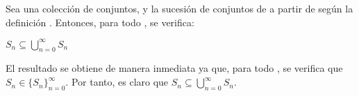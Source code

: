 \begin{isabellebody}
\begin{isamarkuptext}
\begin{lema}
  Sea  una colección de conjuntos,  y  la sucesión de conjuntos de  a partir de
   según la definición . Entonces, para todo , se verifica:

  $S_{n} \subseteq \bigcup_{n = 0}^{\infty} S_{n}$
\end{lema}

\begin{demostracion}
  El resultado se obtiene de manera inmediata ya que, para todo , se verifica que 
  $S_{n} \in \{S_{n}\}_{n = 0}^{\infty}$. Por tanto, es claro que 
  $S_{n} \subseteq \bigcup_{n = 0}^{\infty} S_{n}$.
\end{demostracion}


\end{isamarkuptext}
\end{isabellebody}
